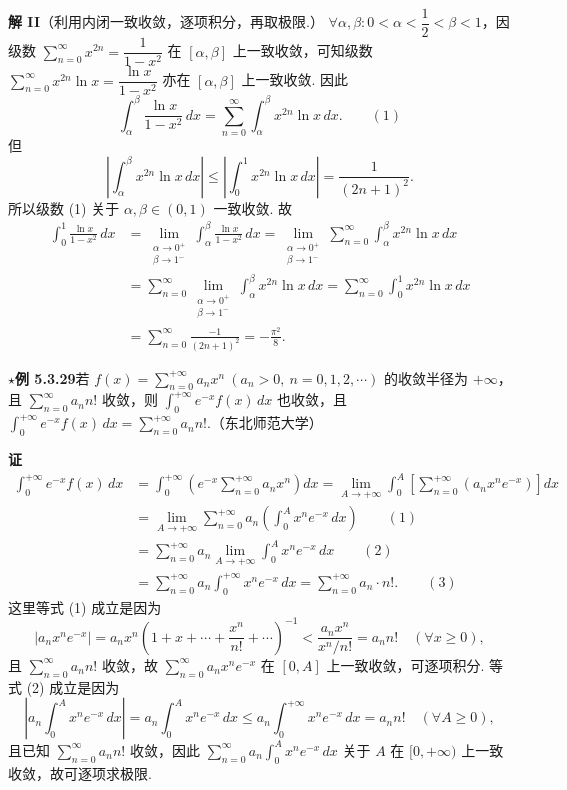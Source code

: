 \documentclass[UTF8, 12pt, fontset=fandol, oneside]{ctexart}
\begin{document}
\noindent\textbf{解 II}\quad （利用内闭一致收敛，逐项积分，再取极限.）
$\forall\alpha,\beta:0<\alpha<\dfrac12<\beta<1$，因级数
$\displaystyle\sum_{n=0}^{\infty}x^{2n}=\dfrac1{1-x^2}$ 在 $[\alpha,\beta]$ 上一致收敛，可知级数
$\displaystyle\sum_{n=0}^{\infty}x^{2n}\ln x=\dfrac{\ln x}{1-x^2}$ 亦在 $[\alpha,\beta]$ 上一致收敛. 因此
\[
  \int_\alpha^\beta\frac{\ln x}{1-x^2}\,dx
  =\sum_{n=0}^{\infty}\int_\alpha^\beta x^{2n}\ln x\,dx. \qquad(1)
\]
但
\[
  \left|\int_\alpha^\beta x^{2n}\ln x\,dx\right|
  \le\left|\int_0^1x^{2n}\ln x\,dx\right|
  =\frac1{(2n+1)^2}.
\]
所以级数 (1) 关于 $\alpha,\beta\in(0,1)$ 一致收敛. 故
\[
\begin{aligned}
\int_0^1\frac{\ln x}{1-x^2}\,dx
&=\lim_{\substack{\alpha\to0^+\\ \beta\to1^-}}\int_\alpha^\beta\frac{\ln x}{1-x^2}\,dx
=\lim_{\substack{\alpha\to0^+\\ \beta\to1^-}}\sum_{n=0}^{\infty}\int_\alpha^\beta x^{2n}\ln x\,dx\\
&=\sum_{n=0}^{\infty}\lim_{\substack{\alpha\to0^+\\ \beta\to1^-}}\int_\alpha^\beta x^{2n}\ln x\,dx
=\sum_{n=0}^{\infty}\int_0^1x^{2n}\ln x\,dx\\
&=\sum_{n=0}^{\infty}\frac{-1}{(2n+1)^2}
=-\frac{\pi^2}{8}.
\end{aligned}
\]

\noindent\(\star\)\textbf{例 5.3.29}\quad 若
$f(x)=\displaystyle\sum_{n=0}^{+\infty}a_nx^n\ (a_n>0,\ n=0,1,2,\cdots)$ 的收敛半径为 $+\infty$，且
$\displaystyle\sum_{n=0}^{\infty}a_nn!$ 收敛，则
$\displaystyle\int_0^{+\infty}e^{-x}f(x)\,dx$ 也收敛，且
$\displaystyle\int_0^{+\infty}e^{-x}f(x)\,dx=\sum_{n=0}^{+\infty}a_nn!$.（东北师范大学）

\noindent\textbf{证}\quad
\[
\begin{aligned}
\int_0^{+\infty}e^{-x}f(x)\,dx
&=\int_0^{+\infty}\left(e^{-x}\sum_{n=0}^{+\infty}a_nx^n\right)dx
=\lim_{A\to+\infty}\int_0^A\left[\sum_{n=0}^{+\infty}(a_nx^ne^{-x})\right]dx\\
&=\lim_{A\to+\infty}\sum_{n=0}^{+\infty}a_n\left(\int_0^A x^ne^{-x}\,dx\right)\qquad(1)\\
&=\sum_{n=0}^{+\infty}a_n\lim_{A\to+\infty}\int_0^A x^ne^{-x}\,dx\qquad(2)\\
&=\sum_{n=0}^{+\infty}a_n\int_0^{+\infty}x^ne^{-x}\,dx
=\sum_{n=0}^{+\infty}a_n\cdot n!.\qquad(3)
\end{aligned}
\]
这里等式 (1) 成立是因为
\[
  |a_nx^ne^{-x}|=a_nx^n\left(1+x+\cdots+\frac{x^n}{n!}+\cdots\right)^{-1}
  <\frac{a_nx^n}{x^n/n!}=a_nn!\quad(\forall x\ge0),
\]
且 $\displaystyle\sum_{n=0}^{\infty}a_nn!$ 收敛，故
$\displaystyle\sum_{n=0}^{\infty}a_nx^ne^{-x}$ 在 $[0,A]$ 上一致收敛，可逐项积分. 等式 (2) 成立是因为
\[
  \left|a_n\int_0^A x^ne^{-x}\,dx\right|
  =a_n\int_0^A x^ne^{-x}\,dx
  \le a_n\int_0^{+\infty}x^ne^{-x}\,dx=a_nn!\quad(\forall A\ge0),
\]
且已知 $\displaystyle\sum_{n=0}^{\infty}a_nn!$ 收敛，因此
$\displaystyle\sum_{n=0}^{\infty}a_n\int_0^A x^ne^{-x}\,dx$ 关于 $A$ 在 $[0,+\infty)$ 上一致收敛，故可逐项求极限.
\end{document}

